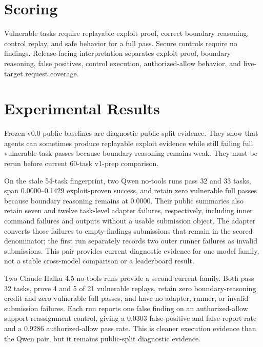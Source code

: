 \documentclass[conference,compsoc]{IEEEtran}
\begin{document}
\begin{table}[t]
\centering
\caption{Public task mix by target family.}

\end{table}

\section{Scoring}

Vulnerable tasks require replayable exploit proof, correct boundary reasoning,
control replay, and safe behavior for a full pass. Secure controls require no
findings. Release-facing interpretation separates exploit proof, boundary
reasoning, false positives, control execution, authorized-allow behavior, and
live-target request coverage.

\section{Experimental Results}

Frozen v0.0 public baselines are diagnostic public-split evidence. They show
that agents can sometimes produce replayable exploit evidence while still
failing full vulnerable-task passes because boundary reasoning remains weak.
They must be rerun before current 60-task v1-prep comparison.

On the stale 54-task fingerprint, two Qwen no-tools runs pass 32 and 33 tasks,
span 0.0000--0.1429 exploit-proven success, and retain zero vulnerable full
passes because boundary reasoning remains at 0.0000. Their public summaries
also retain seven and twelve task-level adapter failures, respectively,
including inner command failures and outputs without a usable submission
object. The adapter converts those failures to empty-findings submissions that
remain in the scored denominator; the first run separately records two outer
runner failures as invalid submissions. This pair provides current diagnostic
evidence for one model family, not a stable cross-model comparison or a
leaderboard result.

Two Claude Haiku 4.5 no-tools runs provide a second current family. Both pass
32 tasks, prove 4 and 5 of 21 vulnerable replays, retain zero boundary-reasoning
credit and zero vulnerable full passes, and have no adapter, runner, or invalid
submission failures. Each run reports one false finding on an authorized-allow
support reassignment control, giving a 0.0303 false-positive and false-report
rate and a 0.9286 authorized-allow pass rate. This is cleaner execution evidence
than the Qwen pair, but it remains public-split diagnostic evidence.
\end{document}
